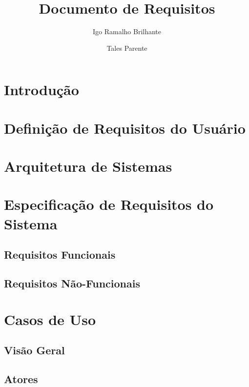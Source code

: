 \documentclass[11pt,a4paper,oneside]{article}
\author{Igo Ramalho Brilhante \and Tales Parente}
\title{Documento de Requisitos}
\begin{document}
\maketitle

\section{Introdução}

\section{Definição de Requisitos do Usuário}

\section{Arquitetura de Sistemas}

\section{Especificação de Requisitos do Sistema}

\subsection{Requisitos Funcionais}

\subsection{Requisitos Não-Funcionais}

\section{Casos de Uso}
\subsection{Visão Geral}
\subsection{Atores}
\end{document}
